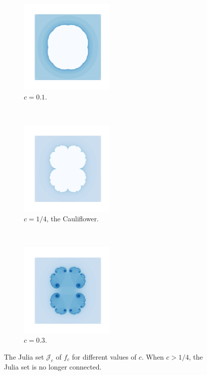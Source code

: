 \begin{figure}[t!] 
    \centering
    ~ 
    \begin{subfigure}[t]{0.3\textwidth}
        \centering
        \includegraphics[height=1.8in]{"figures/julia_01.png"}
        \caption{$c=0.1$.}
    \end{subfigure}	
	~
    \begin{subfigure}[t]{0.25\textwidth}
        \centering
        \includegraphics[height=1.8in]{"figures/julia_025.png"}
        \caption{$c=1/4$, the Cauliflower.}
    \end{subfigure}%
    ~ 
    \begin{subfigure}[t]{0.3\textwidth}
        \centering
        \includegraphics[height=1.8in]{"figures/julia_03.png"}
        \caption{$c=0.3$.}
    \end{subfigure}
    \caption{The Julia set $\mathcal J_c$ of $f_c$ for different values of $c$. When $c>1/4$, the Julia set is no longer connected.}    \label{fig:julia_sets}

\end{figure}
